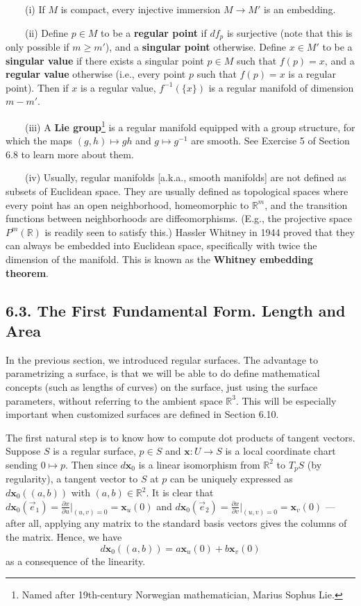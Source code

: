 \documentclass[leqno]{book}
\begin{document}
\begin{enumerate}
~~~~(i) If $M$ is compact, every injective immersion $M\to M'$ is an embedding.

~~~~(ii) Define $p\in M$ to be a \textbf{regular point} if $df_p$ is surjective (note that this is only possible if $m\geqslant m'$), and a \textbf{singular point} otherwise.  Define $x\in M'$ to be a \textbf{singular value} if there exists a singular point $p\in M$ such that $f(p)=x$, and a \textbf{regular value} otherwise (i.e., every point $p$ such that $f(p)=x$ is a regular point).  Then if $x$ is a regular value, $f^{-1}(\{x\})$ is a regular manifold of dimension $m-m'$.

~~~~(iii) A \textbf{Lie group}\footnote{Named after 19th-century Norwegian mathematician, Marius Sophus Lie.} is a regular manifold equipped with a group structure, for which the maps $(g,h)\mapsto gh$ and $g\mapsto g^{-1}$ are smooth.  See Exercise 5 of Section 6.8 to learn more about them.

~~~~(iv) Usually, regular manifolds [a.k.a., smooth manifolds] are not defined as subsets of Euclidean space.  They are usually defined as topological spaces where every point has an open neighborhood, homeomorphic to $\mathbb R^m$, and the transition functions between neighborhoods are diffeomorphisms.  (E.g., the projective space $P^m(\mathbb R)$ is readily seen to satisfy this.)  Hassler Whitney in 1944 proved that they can always be embedded into Euclidean space, specifically with twice the dimension of the manifold.  This is known as the \textbf{Whitney embedding theorem}.
\end{enumerate}

\subsection*{6.3. The First Fundamental Form.  Length and Area}
In the previous section, we introduced regular surfaces.  The advantage to parametrizing a surface, is that we will be able to do define mathematical concepts (such as lengths of curves) on the surface, just using the surface parameters, without referring to the ambient space $\mathbb R^3$.  This will be especially important when customized surfaces are defined in Section 6.10.

The first natural step is to know how to compute dot products of tangent vectors.  Suppose $S$ is a regular surface, $p\in S$ and $\mathbf x:U\to S$ is a local coordinate chart sending $0\mapsto p$.  Then since $d\mathbf x_0$ is a linear isomorphism from $\mathbb R^2$ to $T_pS$ (by regularity), a tangent vector to $S$ at $p$ can be uniquely expressed as $d\mathbf x_0((a,b))$ with $(a,b)\in\mathbb R^2$.  It is clear that $d\mathbf x_0(\vec e_1)=\frac{\partial x}{\partial u}\big|_{(u,v)=0}=\mathbf x_u(0)$ and $d\mathbf x_0(\vec e_2)=\frac{\partial x}{\partial v}\big|_{(u,v)=0}=\mathbf x_v(0)$ \---- after all, applying any matrix to the standard basis vectors gives the columns of the matrix.  Hence, we have
$$d\mathbf x_0((a,b))=a\mathbf x_u(0)+b\mathbf x_v(0)$$
as a consequence of the linearity.
\end{document}
